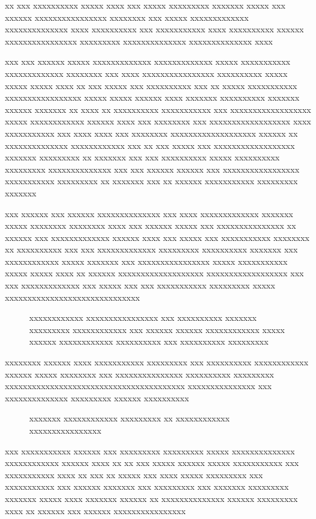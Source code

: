 \begin{introduction}
xx xxx xxxxxxxxxx xxxxx xxxx xxx xxxxx xxxxxxxxx xxxxxxx xxxxx xxx xxxxxx xxxxxxxxxxxxxxxx xxxxxxxx xxx xxxxx xxxxxxxxxxxxx xxxxxxxxxxxxxx xxxx xxxxxxxxxx xxx xxxxxxxxxxx xxxx xxxxxxxxxx xxxxxx xxxxxxxxxxxxxxxx xxxxxxxxx xxxxxxxxxxxxxx xxxxxxxxxxxxxx xxxx

xxx xxx xxxxxx xxxxx xxxxxxxxxxxxx xxxxxxxxxxxxx xxxxx xxxxxxxxxxx xxxxxxxxxxxxx xxxxxxxx xxx xxxx xxxxxxxxxxxxxxxx xxxxxxxxxx xxxxx xxxxx xxxxx xxxx xx xxx xxxxx xxx xxxxxxxxxx xxx xx xxxxx xxxxxxxxxxx xxxxxxxxxxxxxxxxx xxxxx xxxxx xxxxxx xxxx xxxxxxx xxxxxxxxxx xxxxxxx xxxxxx xxxxxxx xx xxxx xx xxxxxxxxxx xxxxxxxxxxx xxx xxxxxxxxxxxxxxxxxx xxxxx xxxxxxxxxxxx xxxxxx xxxx xxx xxxxxxxx xxx xxxxxxxxxxxxxxxxxx xxxx xxxxxxxxxxx xxx xxxx xxxx xxx xxxxxxxx xxxxxxxxxxxxxxxxxxx xxxxxx xx xxxxxxxxxxxxxx xxxxxxxxxxxx xxx xx xxx xxxxx xxx xxxxxxxxxxxxxxxxxx xxxxxxx xxxxxxxxx xx xxxxxxx xxx xxx xxxxxxxxxx xxxxx xxxxxxxxxx xxxxxxxxx xxxxxxxxxxxxxx xxx xxx xxxxxx xxxxxx xxx xxxxxxxxxxxxxxxxx xxxxxxxxxxx xxxxxxxxx xx xxxxxxx xxx xx xxxxxx xxxxxxxxxxx xxxxxxxxx xxxxxxx

xxx xxxxxx xxx xxxxxx xxxxxxxxxxxxxx xxx xxxx xxxxxxxxxxxxx xxxxxxx xxxxx xxxxxxxx xxxxxxxx xxxx xxx xxxxxx xxxxx xxx xxxxxxxxxxxxxxx xx xxxxxx xxx xxxxxxxxxxxxx xxxxxx xxxx xxx xxxxx xxx xxxxxxxxxxx xxxxxxxx xx xxxxxxxxxx xxx xxx xxxxxxxxxxxxx xxxxxxxxx xxxxxxxxxx xxxxxxx xxx xxxxxxxxxxxx xxxxx xxxxxxx xxx xxxxxxxxxxxxxxxx xxxxx xxxxxxxxxxx xxxxx xxxxx xxxx xx xxxxxx xxxxxxxxxxxxxxxxxxx xxxxxxxxxxxxxxxxxx xxx xxx xxxxxxxxxxxxx xxx xxxxx xxx xxx xxxxxxxxxxx xxxxxxxxx xxxxx xxxxxxxxxxxxxxxxxxxxxxxxxxxxxx
\begin{figure}[!ht]
	\centering
	\caption{xxxxxxxxxxxx xxxxxxxxxxxxxxxx xxx xxxxxxxxxx xxxxxxx xxxxxxxxx xxxxxxxxxxxx xxx xxxxxx xxxxxx xxxxxxxxxxxx xxxxx xxxxxx xxxxxxxxxxxx xxxxxxxxxx xxx xxxxxxxxxx xxxxxxxxx}
   \label{fig:xxxxx}
\end{figure}

xxxxxxxx xxxxxx xxxx xxxxxxxxxxx xxxxxxxxx xxx xxxxxxxxxx xxxxxxxxxxxx xxxxxx xxxxx xxxxxxxx xxx xxxxxxxxxxxxxxx xxxxxxxxxx xxxxxxxxx xxxxxxxxxxxxxxxxxxxxxxxxxxxxxxxxxxxxxxxx xxxxxxxxxxxxxxx xxx xxxxxxxxxxxxxx xxxxxxxxx xxxxxx xxxxxxxxxx
\begin{figure}
	\centering
	\caption{xxxxxxx xxxxxxxxxxxx xxxxxxxxx xx xxxxxxxxxxxx xxxxxxxxxxxxxxxx}
   \label{fig:xxxxxx}
\end{figure}

xxx xxxxxxxxxxx xxxxxx xxx xxxxxxxxx xxxxxxxxx xxxxx xxxxxxxxxxxxxx xxxxxxxxxxxx xxxxxx xxxx xx xx xxx xxxxx xxxxxx xxxxx xxxxxxxxxxx xxx xxxxxxxxxxx xxxx xx xxx xx xxxxx xxx xxxx xxxxx xxxxxxxxx xxx xxxxxxxxxxx xxx xxxxxx xxxxxxx xxx xxxxxxxxx xxx xxxxxxx xxxxxxxxx xxxxxxx xxxxx xxxx xxxxxxx xxxxxx xx xxxxxxxxxxxxxx xxxxxx xxxxxxxxx xxxx xx xxxxxx xxx xxxxxx xxxxxxxxxxxxxxxx


\end{introduction}
